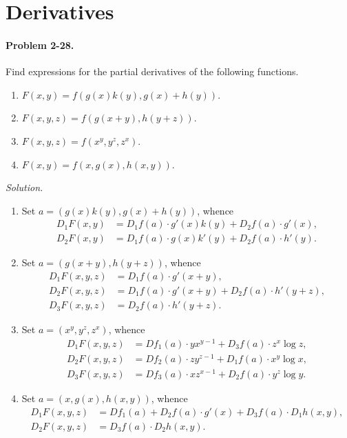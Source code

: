\documentclass[11pt]{report}
\newcommand{\problem}[1]{\paragraph{Problem #1.}}
\newcommand{\solution}{\noindent\textit{Solution.} }
\begin{document}
    \section{Derivatives}
    
    \problem{2-28} Find expressions for the partial derivatives of the following
    functions. \begin{enumerate}
        \itemsep0em
        \item $F(x, y) = f(g(x)k(y), g(x) + h(y))$.
        \item $F(x, y, z) = f(g(x + y), h(y + z))$.
        \item $F(x, y, z) = f(x^y, y^z, z^x)$.
        \item $F(x, y) = f(x, g(x), h(x, y))$.
    \end{enumerate}
    
    \solution \begin{enumerate}
        \item Set $a = (g(x)k(y), g(x) + h(y))$, whence 
        \begin{align*}
            D_1F(x, y) &= D_1f(a)\cdot g'(x)k(y) + D_2f(a)\cdot g'(x), \\
            D_2F(x, y) &= D_1f(a)\cdot g(x)k'(y) + D_2f(a)\cdot h'(y).
        \end{align*}

        \item Set $a = (g(x + y), h(y + z))$, whence \begin{align*}
            D_1F(x, y, z) &= D_1f(a)\cdot g'(x + y), \\
            D_2F(x, y, z) &= D_1f(a)\cdot g'(x + y) + D_2f(a)\cdot h'(y + z), \\
            D_3F(x, y, z) &= D_2f(a)\cdot h'(y + z).
        \end{align*}

        \item Set $a = (x^y, y^z, z^x)$, whence \begin{align*}
            D_1F(x, y, z) &= Df_1(a)\cdot yx^{y - 1} + D_3f(a)\cdot z^x\log{z}, \\
            D_2F(x, y, z) &= Df_2(a)\cdot zy^{z - 1} + D_1f(a)\cdot x^y\log{x}, \\
            D_3F(x, y, z) &= Df_3(a)\cdot xz^{x - 1} + D_2f(a)\cdot y^z\log{y}.
        \end{align*}

        \item Set $a = (x, g(x), h(x, y))$, whence \begin{align*}
            D_1F(x, y, z) &= Df_1(a) + D_2f(a)\cdot g'(x) + D_3f(a)\cdot D_1h(x, y),
            \\
            D_2F(x, y, z) &= D_3f(a)\cdot D_2h(x, y).
        \end{align*}
    \end{enumerate}
\end{document}
